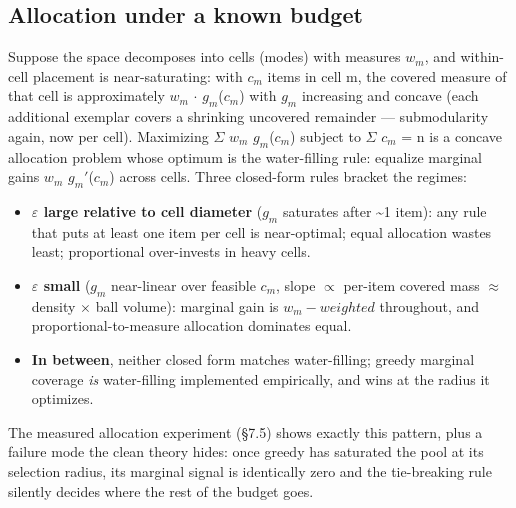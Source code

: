 \documentclass[11pt]{article}
\theoremstyle{plain}
\theoremstyle{definition}
\begin{document}
\subsection{Allocation under a known budget}
Suppose the space decomposes into cells (modes) with measures $w_{m}$, and within-cell placement is near-saturating: with $c_{m}$ items in cell m, the covered measure of that cell is approximately $w_{m}$ $\cdot$ $g_{m}$($c_{m}$) with $g_{m}$ increasing and concave (each additional exemplar covers a shrinking uncovered remainder --- submodularity again, now per cell). Maximizing $\Sigma$ $w_{m}$ $g_{m}$($c_{m}$) subject to $\Sigma$ $c_{m}$ = n is a concave allocation problem whose optimum is the water-filling rule: equalize marginal gains $w_{m}$ $g_{m}$$'$($c_{m}$) across cells. Three closed-form rules bracket the regimes:

\begin{itemize}
  \item \textbf{$\varepsilon$ large relative to cell diameter} ($g_{m}$ saturates after \textasciitilde{}1 item): any rule that puts at least one item per cell is near-optimal; equal allocation wastes least; proportional over-invests in heavy cells.
  \item \textbf{$\varepsilon$ small} ($g_{m}$ near-linear over feasible $c_{m}$, slope $\propto$ per-item covered mass $\approx$ density $\times$ ball volume): marginal gain is $w_{m}-weighted$ throughout, and proportional-to-measure allocation dominates equal.
  \item \textbf{In between}, neither closed form matches water-filling; greedy marginal coverage \emph{is} water-filling implemented empirically, and wins at the radius it optimizes.
\end{itemize}

The measured allocation experiment (\S{}7.5) shows exactly this pattern, plus a failure mode the clean theory hides: once greedy has saturated the pool at its selection radius, its marginal signal is identically zero and the tie-breaking rule silently decides where the rest of the budget goes.
\end{document}
